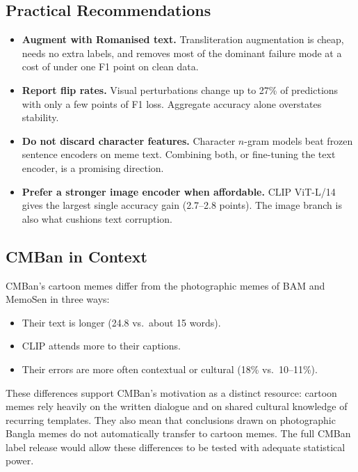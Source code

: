 \subsection{Practical Recommendations}
\begin{itemize}
  \item \textbf{Augment with Romanised text.} Transliteration augmentation is cheap, needs no extra labels, and
  removes most of the dominant failure mode at a cost of under one F1 point on clean data.
  \item \textbf{Report flip rates.} Visual perturbations change up to 27\% of predictions with only a few points of
  F1 loss. Aggregate accuracy alone overstates stability.
  \item \textbf{Do not discard character features.} Character $n$-gram models beat frozen sentence encoders on
  meme text. Combining both, or fine-tuning the text encoder, is a promising direction.
  \item \textbf{Prefer a stronger image encoder when affordable.} CLIP ViT-L/14 gives the largest single accuracy
  gain (2.7--2.8 points). The image branch is also what cushions text corruption.
\end{itemize}

\subsection{CMBan in Context}
CMBan's cartoon memes differ from the photographic memes of BAM and MemoSen in three ways:
\begin{itemize}
  \item Their text is longer (24.8 vs.\ about 15 words).
  \item CLIP attends more to their captions.
  \item Their errors are more often contextual or cultural (18\% vs.\ 10--11\%).
\end{itemize}
These differences support CMBan's motivation as a distinct resource: cartoon memes rely heavily on the written
dialogue and on shared cultural knowledge of recurring templates. They also mean that conclusions drawn on
photographic Bangla memes do not automatically transfer to cartoon memes. The full CMBan label release would allow
these differences to be tested with adequate statistical power.
